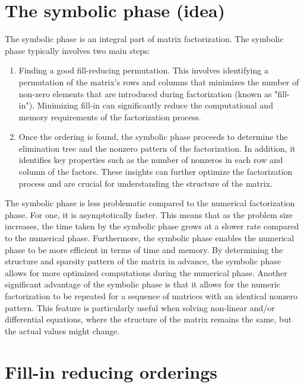 \documentclass[11pt]{book}
\begin{document}
\section*{The symbolic phase (idea)}
The symbolic phase is an integral part of matrix factorization. 
The symbolic phase typically involves two main steps:  
\begin{enumerate}  
\item Finding a good fill-reducing permutation. This involves identifying a permutation of the matrix's rows and columns that minimizes the number of non-zero elements that are introduced during factorization (known as "fill-in"). Minimizing fill-in can significantly reduce the computational and memory requirements of the factorization process.  
\item Once the ordering is found, the symbolic phase proceeds to determine the elimination tree and the nonzero pattern of the factorization. In addition, it identifies key properties such as the number of nonzeros in each row and column of the factors. These insights can further optimize the factorization process and are crucial for understanding the structure of the matrix.  
\end{enumerate}    
The symbolic phase is less problematic compared to the numerical factorization phase. For one, it is asymptotically faster. This means that as the problem size increases, the time taken by the symbolic phase grows at a slower rate compared to the numerical phase. Furthermore, the symbolic phase enables the numerical phase to be more efficient in terms of time and memory. By determining the structure and sparsity pattern of the matrix in advance, the symbolic phase allows for more optimized computations during the numerical phase. Another significant advantage of the symbolic phase is that it allows for the numeric factorization to be repeated for a sequence of matrices with an identical nonzero pattern. This feature is particularly useful when solving non-linear and/or differential equations, where the structure of the matrix remains the same, but the actual values might change.  



\section*{Fill-in reducing orderings}
\end{document}
